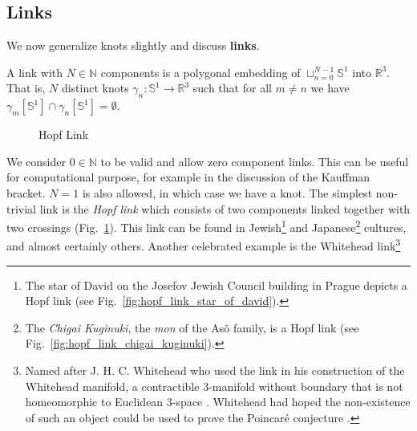     \subsection{Links}
        We now generalize knots slightly and discuss \textbf{links}.
        \begin{definition}
            A link with $N\in\mathbb{N}$ components is a polygonal embedding of
            $\sqcup_{n=0}^{N-1}\mathbb{S}^{1}$ into $\mathbb{R}^{3}$.
            That is, $N$ distinct knots
            $\gamma_{n}:\mathbb{S}^{1}\rightarrow\mathbb{R}^{3}$ such that for
            all $m\ne{n}$ we have
            $\gamma_{m}[\mathbb{S}^{1}]\cap\gamma_{n}[\mathbb{S}^{1}]=\emptyset$.
        \end{definition}
        \begin{figure}
            \centering
            \caption{Hopf Link}
            \label{fig:hopf_link_diagram}
        \end{figure}
        We consider $0\in\mathbb{N}$ to be valid and allow zero component links.
        This can be useful for computational purpose, for example in the
        discussion of the Kauffman bracket. $N=1$ is also allowed, in which
        case we have a knot. The simplest non-trivial link is the
        \textit{Hopf link} which consists of two components linked together
        with two crossings (Fig.~\ref{fig:hopf_link_diagram}).
        This link can be found in Jewish\footnote{%
            The star of David on the Josefov Jewish Council building in Prague
            depicts a Hopf link \cite{KatlasHopfLink}
            (see Fig.~\ref{fig:hopf_link_star_of_david}).
        }
        and Japanese\footnote{%
            The \textit{Chigai Kuginuki}, the \textit{mon}
            of the As\~{o} family, is a Hopf link \cite{KatlasHopfLink}
            (see Fig.~\ref{fig:hopf_link_chigai_kuginuki}).
        }
        cultures, and almost certainly others. Another celebrated example is
        the Whitehead link\footnote{%
            Named after J. H. C. Whitehead who used the link in his
            construction of the Whitehead
            manifold, a contractible 3-manifold without boundary that is not
            homeomorphic to Euclidean 3-space \cite{WhiteheadManifold}.
            Whitehead had hoped the non-existence of such an object could be
            used to prove the Poincar\'{e} conjecture
            \cite{WhiteheadPoincareConjecture}.
        }
